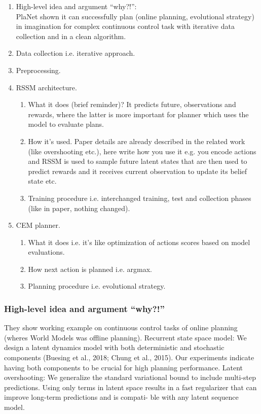 \begin{enumerate}
\item High-level idea and argument ``why?!'':\\
  PlaNet shown it can successfully plan (online planning, evolutional strategy) in imagination for complex continuous control task with iterative data collection and in a clean algorithm.
\item Data collection i.e. iterative approach.
\item Preprocessing.
\item RSSM architecture.\\ 
  \begin{enumerate}
  \item What it does (brief reminder)? It predicts future, observations and rewards, where the latter is more important for planner which uses the model to evaluate plans. 
  \item How it's used. Paper details are already described in the related work (like overshooting etc.), here write how you use it e.g. you encode actions and RSSM is used to sample future latent states that are then used to predict rewards and it receives current observation to update its belief state etc.
  \item Training procedure i.e. interchanged training, test and collection phases (like in paper, nothing changed).
  \end{enumerate}
\item CEM planner.
  \begin{enumerate}
  \item What it does i.e. it's like optimization of actions scores based on model evaluations.
  \item How next action is planned i.e. argmax.
  \item Planning procedure i.e. evolutional strategy.
  \end{enumerate}
\end{enumerate}

\subsubsection{High-level idea and argument ``why?!''}
They show working example on continuous control tasks of online planning (wheres World Models was offline planning). 
Recurrent state space model: We design a latent dynamics model with both deterministic and stochastic components (Buesing et al., 2018; Chung et al., 2015). Our experiments indicate having both components to be crucial for high planning performance.
Latent overshooting: We generalize the standard variational bound to include multi-step predictions. Using only terms in latent space results in a fast regularizer that can improve long-term predictions and is compati- ble with any latent sequence model.

